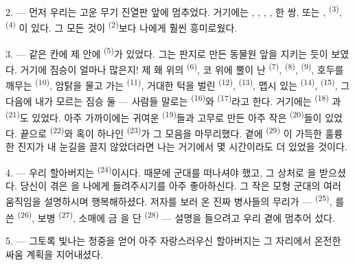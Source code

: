 2. --- 먼저 우리는 고운 무기 진열판 앞에 멈추었다. 거기에는 ,
, , ,  한 쌍, 또는
,  \textsuperscript{(3)},  \textsuperscript{(4)}
이 있다. 그 모든 것이  \textsuperscript{(2)}보다 나에게 훨씬 흥미로웠다.

\VUsaut{3.0mm}
\VUsaut{2.6mm}

3. --- 같은 칸에 제  안에  \textsuperscript{(5)}가 있었다. 그는
판지로 만든 동물원 앞을 지키는 듯이 보였다. 거기에 짐승이 얼마나 많은지! 제 홰 위의
 \textsuperscript{(6)}, 코 위에 뿔이 난  \textsuperscript{(7)},
 \textsuperscript{(8)},  \textsuperscript{(9)}, 호두를 깨무는
 \textsuperscript{(10)}, 암탉을 물고 가는  \textsuperscript{(11)},
거대한 턱을 벌린  \textsuperscript{(12)},  \textsuperscript{(13)},
맵시 있는  \textsuperscript{(14)},  \textsuperscript{(15)},
그 다음에 내가 모르는 짐승 둘 — 사람들 말로는  \textsuperscript{(16)}와
 \textsuperscript{(17)}라고 한다. 거기에는  \textsuperscript{(18)}
과  \textsuperscript{(21)}도 있었다. 아주 가까이에는 귀여운 
\textsuperscript{(19)}들과 고무로 만든 아주 작은  \textsuperscript{(20)}들이
있었다. 끝으로  \textsuperscript{(22)}와 혹이 하나인 
\textsuperscript{(23)}가 그 모음을 마무리했다. 곁에  \textsuperscript{(29)}
이 가득한 훌륭한 진지가 내 눈길을 끌지 않았더라면 나는 거기에서 몇 시간이라도 더 있었을
것이다.

\VUsaut{4.0mm}
\VUsaut{2.8mm}

4. --- 우리 할아버지는  \textsuperscript{(24)}이시다. 
때문에 군대를 떠나셔야 했고, 그 상처로 을 받으셨다. 당신이 겪은
을 나에게 들려주시기를 아주 좋아하신다. 그 작은 모형 군대의 여러 움직임을
설명하시며 행복해하셨다. 저자를 보러 온 진짜 병사들의 무리가 — 
\textsuperscript{(25)}, 를 쓴  \textsuperscript{(26)},
보병  \textsuperscript{(27)}, 소매에 금 을 단
 \textsuperscript{(28)} — 설명을 들으려고 우리 곁에 멈추어 섰다.

5. --- 그토록 빛나는 청중을 얻어 아주 자랑스러우신 할아버지는 그 자리에서 온전한 싸움
계획을 지어내셨다.

